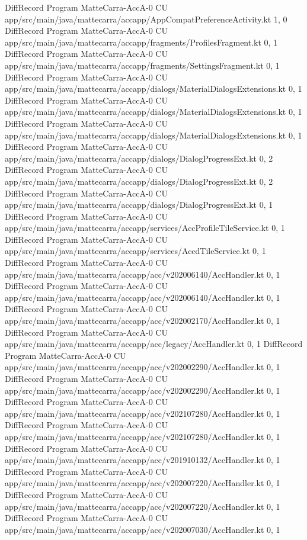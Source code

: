 DiffRecord Program MatteCarra-AccA-0 CU app/src/main/java/mattecarra/accapp/AppCompatPreferenceActivity.kt  {1, 0}
DiffRecord Program MatteCarra-AccA-0 CU app/src/main/java/mattecarra/accapp/fragments/ProfilesFragment.kt  {0, 1}
DiffRecord Program MatteCarra-AccA-0 CU app/src/main/java/mattecarra/accapp/fragments/SettingsFragment.kt  {0, 1}
DiffRecord Program MatteCarra-AccA-0 CU app/src/main/java/mattecarra/accapp/dialogs/MaterialDialogsExtensions.kt  {0, 1}
DiffRecord Program MatteCarra-AccA-0 CU app/src/main/java/mattecarra/accapp/dialogs/MaterialDialogsExtensions.kt  {0, 1}
DiffRecord Program MatteCarra-AccA-0 CU app/src/main/java/mattecarra/accapp/dialogs/MaterialDialogsExtensions.kt  {0, 1}
DiffRecord Program MatteCarra-AccA-0 CU app/src/main/java/mattecarra/accapp/dialogs/DialogProgressExt.kt  {0, 2}
DiffRecord Program MatteCarra-AccA-0 CU app/src/main/java/mattecarra/accapp/dialogs/DialogProgressExt.kt  {0, 2}
DiffRecord Program MatteCarra-AccA-0 CU app/src/main/java/mattecarra/accapp/dialogs/DialogProgressExt.kt  {0, 1}
DiffRecord Program MatteCarra-AccA-0 CU app/src/main/java/mattecarra/accapp/services/AccProfileTileService.kt  {0, 1}
DiffRecord Program MatteCarra-AccA-0 CU app/src/main/java/mattecarra/accapp/services/AccdTileService.kt  {0, 1}
DiffRecord Program MatteCarra-AccA-0 CU app/src/main/java/mattecarra/accapp/acc/v202006140/AccHandler.kt  {0, 1}
DiffRecord Program MatteCarra-AccA-0 CU app/src/main/java/mattecarra/accapp/acc/v202006140/AccHandler.kt  {0, 1}
DiffRecord Program MatteCarra-AccA-0 CU app/src/main/java/mattecarra/accapp/acc/v202002170/AccHandler.kt  {0, 1}
DiffRecord Program MatteCarra-AccA-0 CU app/src/main/java/mattecarra/accapp/acc/legacy/AccHandler.kt  {0, 1}
DiffRecord Program MatteCarra-AccA-0 CU app/src/main/java/mattecarra/accapp/acc/v202002290/AccHandler.kt  {0, 1}
DiffRecord Program MatteCarra-AccA-0 CU app/src/main/java/mattecarra/accapp/acc/v202002290/AccHandler.kt  {0, 1}
DiffRecord Program MatteCarra-AccA-0 CU app/src/main/java/mattecarra/accapp/acc/v202107280/AccHandler.kt  {0, 1}
DiffRecord Program MatteCarra-AccA-0 CU app/src/main/java/mattecarra/accapp/acc/v202107280/AccHandler.kt  {0, 1}
DiffRecord Program MatteCarra-AccA-0 CU app/src/main/java/mattecarra/accapp/acc/v201910132/AccHandler.kt  {0, 1}
DiffRecord Program MatteCarra-AccA-0 CU app/src/main/java/mattecarra/accapp/acc/v202007220/AccHandler.kt  {0, 1}
DiffRecord Program MatteCarra-AccA-0 CU app/src/main/java/mattecarra/accapp/acc/v202007220/AccHandler.kt  {0, 1}
DiffRecord Program MatteCarra-AccA-0 CU app/src/main/java/mattecarra/accapp/acc/v202007030/AccHandler.kt  {0, 1}
